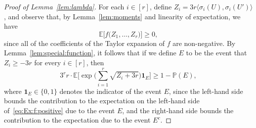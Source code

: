 \documentclass[12pt,reqno]{amsart}
\theoremstyle{definition}
\theoremstyle{remark}
\def\Pr{\mathbb{P}}
\newcommand\Ex{\mathbb{E}}
\newcommand\id{\hbox{$1\mkern-6.5mu1$}}
\renewcommand{\ge}{\geqslant}
\begin{document}
\begin{proof}[Proof of Lemma~\ref{lem:lambda}]
For each $i \in [r]$, define $Z_i = 3r\big\langle \sigma_i(U),\sigma_i(U') \big\rangle$, and observe that, by Lemma~\ref{lem:moments} and linearity of expectation, we have
\begin{equation}\label{eq:Ex:f:positive} 
\Ex\big[ f\big( Z_1,\ldots,Z_r \big) \big] \ge 0,
\end{equation}
since all of the coefficients of the Taylor expansion of $f$ are non-negative. By Lemma~\ref{lem:special:function}, it follows that if we define $E$ to be the event that $Z_i \ge -3r$ %
for every $i \in [r]$, then 
\begin{equation}\label{eq:eventE:inequality} 
3^r r \cdot \Ex\bigg[ \exp\bigg( \sum_{i = 1}^r \sqrt{ Z_i + 3r } \bigg) \mathbf{1}_E \bigg] \ge 1 - \Pr(E),
\end{equation}
where $\mathbf{1}_E \in \{0,1\}$ denotes the indicator of the event $E$, since the left-hand side bounds the %
contribution to the expectation on the left-hand side of~\eqref{eq:Ex:f:positive} due to the event $E$, and the right-hand side bounds the %
contribution to the expectation due to the event $E^c$. 


\end{proof}
\end{document}
